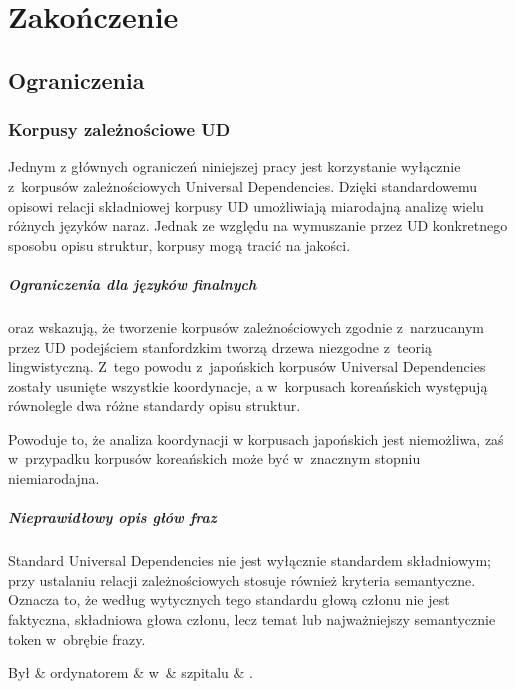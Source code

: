 \chapter{Zakończenie} \label{ch7}

\section{Ograniczenia}

\subsection{Korpusy zależnościowe UD}

Jednym z głównych ograniczeń niniejszej pracy jest korzystanie wyłącznie z~korpusów zależnościowych Universal Dependencies. Dzięki standardowemu opisowi relacji składniowej korpusy UD umożliwiają miarodajną analizę wielu różnych języków naraz. Jednak ze względu na wymuszanie przez UD konkretnego sposobu opisu struktur, korpusy mogą tracić na jakości.

\paragraph{Ograniczenia dla języków finalnych}
\cite{choi2011statistical} oraz \cite{kanayama2018coordinate} wskazują, że tworzenie korpusów zależnościowych zgodnie z~narzucanym przez UD podejściem stanfordzkim tworzą drzewa niezgodne z~teorią lingwistyczną. Z~tego powodu z~japońskich korpusów Universal Dependencies zostały usunięte wszystkie koordynacje, a w~korpusach koreańskich występują równolegle dwa różne standardy opisu struktur.

Powoduje to, że analiza koordynacji w korpusach japońskich jest niemożliwa, zaś w~przypadku korpusów koreańskich może być w~znacznym stopniu niemiarodajna.

\paragraph{Nieprawidłowy opis głów fraz}
Standard Universal Dependencies nie jest wyłącznie standardem składniowym; przy ustalaniu relacji zależnościowych stosuje również kryteria semantyczne. Oznacza to, że według wytycznych tego standardu głową członu nie jest faktyczna, składniowa głowa członu, lecz temat lub najważniejszy semantycznie token w~obrębie frazy. 

\begin{exe} 
\ex
\begin{dependency}[baseline=-\the\dimexpr\fontdimen22\textfont2\relax]
\begin{deptext}[column sep=1em]
Był \& ordynatorem \& w~\& szpitalu \& .  \\ 
\end{deptext}
\end{dependency}
\label{UD-złe}
\end{exe}

